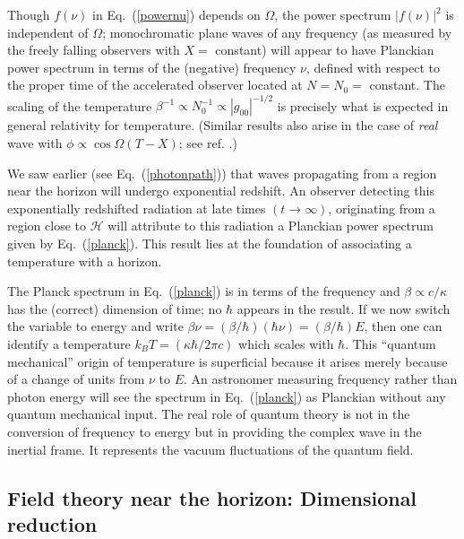 \documentclass[12pt]{iopart}
\begin{document}
  Though $f(\nu)$ in Eq.~(\ref{powernu})
   depends on $\Omega$, the power spectrum $|f(\nu)|^2$ is independent of 
  $\Omega$; monochromatic plane waves of any frequency (as measured by the freely falling observers with $X=$ constant) will appear to have Planckian
  power spectrum in terms of the (negative) frequency $\nu$, defined with respect to the proper time of 
   the accelerated observer located at $N=N_0=$ constant.  The scaling of the temperature $\beta^{-1}\propto N_0^{-1}\propto |g_{00}|^{-1/2}$ is precisely what is expected in general relativity for temperature.
   (Similar results also arise in the case of \textit{real} wave with $\phi
   \propto \cos \Omega(T-X)$; see ref. \cite{tplsksrinia,tplsksrinib}.)  
   
   We saw earlier (see Eq.~(\ref{photonpath})) that  waves propagating 
   from a region near the horizon will undergo
   exponential redshift.
  An observer detecting this  exponentially redshifted radiation 
   at late times $(t\to \infty)$, originating from  a region close 
   to $\mathcal{H}$ will attribute to this radiation a Planckian power spectrum given by  Eq.~(\ref{planck}). 
   This 
  result lies at the foundation of associating a temperature with a horizon.
  
 
  
   The Planck spectrum in  Eq.~(\ref{planck})
  is in terms of the  frequency and $\beta\propto c/\kappa$ has the  (correct) dimension of  time;   no $\hbar$
appears in the result. If we now switch  the variable to energy
   and write $\beta \nu = (\beta/\hbar) (\hbar \nu)
  = (\beta/\hbar) E$, then one can identify a temperature $k_BT =( \kappa\hbar /2\pi c)$ which
  scales with $\hbar$. This ``quantum mechanical'' origin of temperature 
  is superficial because it arises merely because of a  change of  units from $\nu $ to $E$.
  An astronomer measuring frequency rather than photon energy  will see the spectrum in 
  Eq.~(\ref{planck}) as Planckian without any quantum mechanical input. 
The real role of quantum theory is not in  the conversion of frequency to energy but in providing the complex wave in the inertial frame. It represents  the vacuum fluctuations of the quantum field.
  
  
  \subsection{Field theory near the horizon: Dimensional reduction}\label{sec:ftdim}
  
\end{document}
